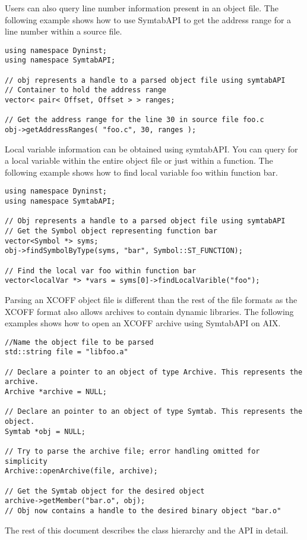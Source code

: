 Users can also query line number information present in an object file. The following example shows how to use SymtabAPI to get the address range for a line number within a source file.

\begin{lstlisting}
using namespace Dyninst;
using namespace SymtabAPI;

// obj represents a handle to a parsed object file using symtabAPI
// Container to hold the address range
vector< pair< Offset, Offset > > ranges;

// Get the address range for the line 30 in source file foo.c
obj->getAddressRanges( "foo.c", 30, ranges );
\end{lstlisting}

Local variable information can be obtained using symtabAPI. You can query for a local variable within the entire object file or just within a function. The following example shows how to find local variable foo within function bar.

\begin{lstlisting}
using namespace Dyninst;
using namespace SymtabAPI;

// Obj represents a handle to a parsed object file using symtabAPI
// Get the Symbol object representing function bar
vector<Symbol *> syms;
obj->findSymbolByType(syms, "bar", Symbol::ST_FUNCTION);

// Find the local var foo within function bar
vector<localVar *> *vars = syms[0]->findLocalVarible("foo");
\end{lstlisting}

Parsing an XCOFF object file is different than the rest of the file formats as the XCOFF format also allows archives to contain dynamic libraries. The following examples shows how to open an XCOFF archive using SymtabAPI on AIX.

\begin{lstlisting}
//Name the object file to be parsed
std::string file = "libfoo.a"

// Declare a pointer to an object of type Archive. This represents the archive.
Archive *archive = NULL;

// Declare an pointer to an object of type Symtab. This represents the object.
Symtab *obj = NULL;

// Try to parse the archive file; error handling omitted for simplicity
Archive::openArchive(file, archive);

// Get the Symtab object for the desired object
archive->getMember("bar.o", obj);
// Obj now contains a handle to the desired binary object "bar.o"
\end{lstlisting}

The rest of this document describes the class hierarchy and the API in detail.
